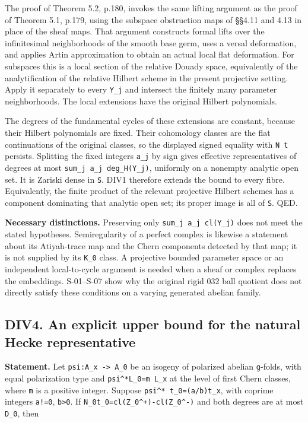 \documentclass[11pt,a4paper]{article}
\theoremstyle{definition}
\begin{document}
The proof of Theorem 5.2, p.180, invokes the same lifting argument as
the proof of Theorem 5.1, p.179, using the subspace obstruction maps of
§§4.11 and 4.13 in place of the sheaf maps. That argument constructs
formal lifts over the infinitesimal neighborhoods of the smooth base
germ, uses a versal deformation, and applies Artin approximation to
obtain an actual local flat deformation. For subspaces this is a local
section of the relative Douady space, equivalently of the
analytification of the relative Hilbert scheme in the present projective
setting. Apply it separately to every \texttt{Y\_j} and intersect the
finitely many parameter neighborhoods. The local extensions have the
original Hilbert polynomials.

The degrees of the fundamental cycles of these extensions are constant,
because their Hilbert polynomials are fixed. Their cohomology classes
are the flat continuations of the original classes, so the displayed
signed equality with \texttt{N\ t} persists. Splitting the fixed
integers \texttt{a\_j} by sign gives effective representatives of
degrees at most \texttt{sum\_j\ \textbar{}a\_j\textbar{}\ deg\_H(Y\_j)},
uniformly on a nonempty analytic open set. It is Zariski dense in
\texttt{S}. DIV1 therefore extends the bound to every fibre.
Equivalently, the finite product of the relevant projective Hilbert
schemes has a component dominating that analytic open set; its proper
image is all of \texttt{S}. QED.

\textbf{Necessary distinctions.} Preserving only
\texttt{sum\_j\ a\_j\ cl(Y\_j)} does not meet the stated hypotheses.
Semiregularity of a perfect complex is likewise a statement about its
Atiyah-trace map and the Chern components detected by that map; it is
not supplied by its \texttt{K\_0} class. A projective bounded parameter
space or an independent local-to-cycle argument is needed when a sheaf
or complex replaces the embeddings. S-01--S-07 show why the original
rigid 032 ball quotient does not directly satisfy these conditions on a
varying generated abelian family.

\subsection{DIV4. An explicit upper bound for the natural Hecke
representative}\label{bounded-division-div4.-an-explicit-upper-bound-for-the-natural-hecke-representative}

\textbf{Statement.} Let \texttt{psi:A\_x\ -\textgreater{}\ A\_0} be an
isogeny of polarized abelian \texttt{g}-folds, with equal polarization
type and \texttt{psi\^{}*L\_0=m\ L\_x} at the level of first Chern
classes, where \texttt{m} is a positive integer. Suppose
\texttt{psi\^{}*\ t\_0=(a/b)t\_x}, with coprime integers \texttt{a!=0},
\texttt{b\textgreater{}0}. If
\texttt{N\_0t\_0=cl(Z\_0\^{}+)-cl(Z\_0\^{}-)} and both degrees are at
most \texttt{D\_0}, then
\end{document}
